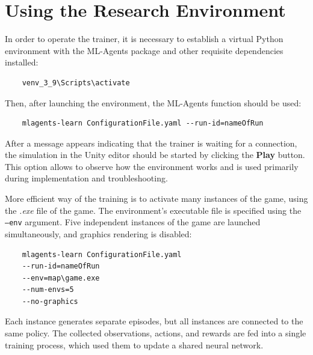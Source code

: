 \section{Using the Research Environment}
In order to operate the trainer, it is necessary to establish a virtual Python environment with the ML-Agents package and other requisite dependencies installed:
	 \begin{verbatim}
	venv_3_9\Scripts\activate
\end{verbatim}
Then, after launching the environment, the ML-Agents function should be used:
\begin{verbatim}
	mlagents-learn ConfigurationFile.yaml --run-id=nameOfRun
\end{verbatim}
After a message appears indicating that the trainer is waiting for a connection, the simulation in the Unity editor should be started by clicking the \textbf{Play} button. This option allows to observe how the environment works and is used primarily during implementation and troubleshooting.

More efficient way of the training is to activate many instances of the game, using the \textit{.exe} file of the game. The environment’s executable file is specified using the \texttt{--env} argument. Five independent instances of the game are launched simultaneously, and graphics rendering is disabled:
\begin{verbatim}
	mlagents-learn ConfigurationFile.yaml
	--run-id=nameOfRun
	--env=map\game.exe
	--num-envs=5
	--no-graphics
\end{verbatim}
Each instance generates separate episodes, but all instances are connected to the same policy. The collected observations, actions, and rewards are fed into a single training process, which used them to update a shared neural network.

